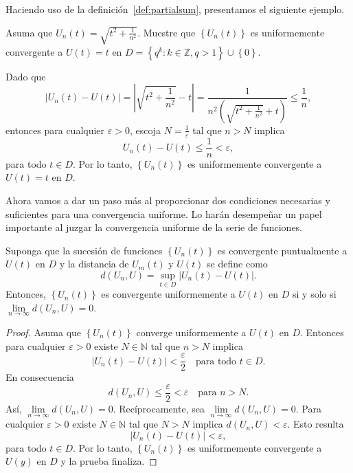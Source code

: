 Haciendo uso de la definición~\eqref{def:partialsum}, presentamos el siguiente ejemplo.
\begin{example}\label{ex:1}
	Asuma que $U_{n}\left(t\right)=\sqrt{t^{2}+\frac{1}{n^{2}}}$. Muestre que $\left\{U_{n}\left(t\right)\right\}$ es uniformemente convergente a $U\left(t\right)=t$ en $D=\left\{q^{k}:k\in\mathds{Z},q>1\right\}\cup\left\{0\right\}$.

	Dado que \[ \left|U_{n}\left(t\right)-U\left(t\right)\right|=\left|\sqrt{t^{2}+\frac{1}{n^{2}}}-t\right|=\frac{1}{n^{2}\left(\sqrt{t^{2}+\frac{1}{n^{2}}}+t\right)}\leq\frac{1}{n}, \] entonces para cualquier $\varepsilon>0$, escoja $N=\frac{1}{\varepsilon}$ tal que $n>N$ implica \[ U_{n}\left(t\right)-U\left(t\right)\leq\frac{1}{n}<\varepsilon, \] para todo $t\in D$. Por lo tanto, $\left\{U_{n}\left(t\right)\right\}$ es uniformemente convergente a $U\left(t\right)=t$ en $D$.
\end{example}
Ahora vamos a dar un paso más al proporcionar dos condiciones necesarias y suficientes para una convergencia uniforme. Lo harán desempeñar un papel importante al juzgar la convergencia uniforme de la serie de funciones.
\begin{theorem}\label{thm:uniform}
	Suponga que la sucesión de funciones $\left\{U_{n}\left(t\right)\right\}$ es convergente puntualmente a $U\left(t\right)$ en $D$ y la distancia de $U_{m}\left(t\right)$ y $U\left(t\right)$ se define como \[ d\left(U_{n},U\right)=\sup_{t\in D}\left|U_{n}\left(t\right)-U\left(t\right)\right|. \] Entonces, $\left\{U_{n}\left(t\right)\right\}$ es convergente uniformemente a $U\left(t\right)$ en $D$ si y solo si $\lim\limits_{n\to\infty}d\left(U_{n},U\right)=0$.
\end{theorem}
\begin{proof}
	Asuma que $\left\{U_{n}\left(t\right)\right\}$ converge uniformemente a $U\left(t\right)$ en $D$. Entonces para cualquier $\varepsilon>0$ existe $N\in\mathds{N}$ tal que $n>N$ implica \[ \left|U_{n}\left(t\right)-U\left(t\right)\right|<\frac{\varepsilon}{2}\quad\text{para todo }t\in D. \] En consecuencia \[ d\left(U_{n},U\right)\leq\frac{\varepsilon}{2}<\varepsilon\quad\text{para }n>N. \] Así, $\lim\limits_{n\to\infty}d\left(U_{n},U\right)=0$. Recíprocamente, sea $\lim\limits_{n\to\infty}d\left(U_{n},U\right)=0$. Para cualquier $\varepsilon>0$ existe $N\in\mathds{N}$ tal que $N>N$ implica $d\left(U_{n},U\right)<\varepsilon$. Esto resulta \[ \left|U_{n}\left(t\right)-U\left(t\right)\right|<\varepsilon, \] para todo $t\in D$. Por lo tanto, $\left\{U_{n}\left(t\right)\right\}$ es uniformemente convergente a $U\left(y\right)$ en $D$ y la prueba finaliza.
\end{proof}

